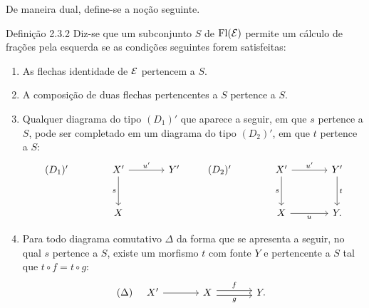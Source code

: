 De maneira dual, define-se a noção seguinte.

\begin{statement}{Definição 2.3.2}
Diz-se que um subconjunto $S$ de $\operatorname{Fl}(\mathcal E)$ permite um cálculo de frações pela esquerda se as condições seguintes forem satisfeitas:
\begin{enumerate}[label=(\alph*)]
\item[(a')] As flechas identidade de $\mathcal E$ pertencem a $S$.
\item[(b')] A composição de duas flechas pertencentes a $S$ pertence a $S$.
\item[(c')] Qualquer diagrama do tipo $(D_1)'$ que aparece a seguir, em que $s$ pertence a $S$, pode ser completado em um diagrama do tipo $(D_2)'$, em que $t$ pertence a $S$:
\[
\begin{tikzcd}[column sep=large,row sep=large]
(D_1)'& X' \arrow[r,"u'"] \arrow[d,"s"'] & Y'\\
& X
\end{tikzcd}
\qquad
\begin{tikzcd}[column sep=large,row sep=large]
(D_2)'& X' \arrow[r,"u'"] \arrow[d,"s"'] & Y' \arrow[d,"t"]\\
& X \arrow[r,"u"'] & Y .
\end{tikzcd}
\]
\item[(d)'] Para todo diagrama comutativo $\Delta$ da forma que se apresenta a seguir, no qual $s$ pertence a $S$, existe um morfismo $t$ com fonte $Y$ e pertencente a $S$ tal que $t\circ f=t\circ g$:
\[
(\Delta)\quad
\begin{tikzcd}[column sep=large]
X' \arrow[r] & X \arrow[r,shift left,"f"] \arrow[r,shift right,"g"'] & Y .
\end{tikzcd}
\]
\end{enumerate}
\end{statement}
